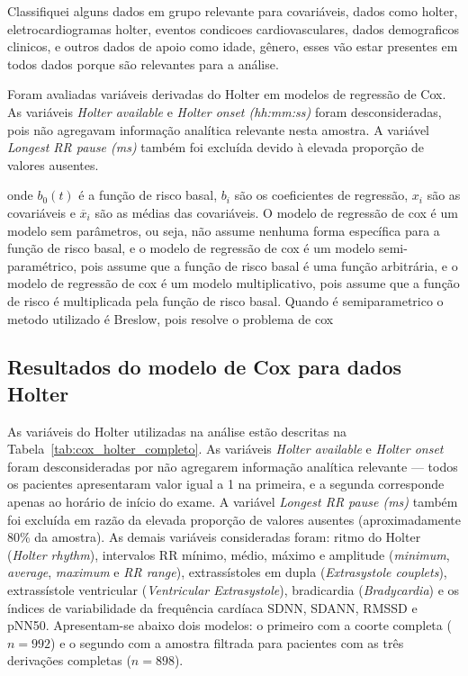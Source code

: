 Classifiquei alguns dados em grupo relevante para covariáveis, dados como holter, eletrocardiogramas holter, eventos condicoes cardiovasculares, dados demograficos clinicos, e outros dados de apoio como idade, gênero, esses vão estar presentes em todos dados porque são relevantes para a análise.


Foram avaliadas variáveis derivadas do Holter em modelos de regressão de Cox. As variáveis \textit{Holter available} e \textit{Holter onset (hh:mm:ss)} foram desconsideradas, pois não agregavam informa\c{c}\~ao anal\'itica relevante nesta amostra. A variável \textit{Longest RR pause (ms)} também foi excluída devido à elevada proporção de valores ausentes.

onde $b_0(t)$ é a função de risco basal, $b_i$ são os coeficientes de regressão, $x_i$ são as covariáveis e $\overline{x}_i$ são as médias das covariáveis. O modelo de regressão de cox é um modelo sem parâmetros, ou seja, não assume nenhuma forma específica para a função de risco basal, e o modelo de regressão de cox é um modelo semi-paramétrico, pois assume que a função de risco basal é uma função arbitrária, e o modelo de regressão de cox é um modelo multiplicativo, pois assume que a função de risco é multiplicada pela função de risco basal. Quando é semiparametrico o metodo utilizado é Breslow, pois resolve o problema de cox

\subsection{Resultados do modelo de Cox para dados Holter}


As variáveis do Holter utilizadas na análise estão descritas na
Tabela~\ref{tab:cox_holter_completo}. As variáveis \textit{Holter available}
e \textit{Holter onset} foram desconsideradas por não agregarem informação
analítica relevante — todos os pacientes apresentaram valor igual a 1 na
primeira, e a segunda corresponde apenas ao horário de início do exame.
A variável \textit{Longest RR pause (ms)} também foi excluída em razão da
elevada proporção de valores ausentes (aproximadamente 80\% da amostra).
As demais variáveis consideradas foram: ritmo do Holter
(\textit{Holter rhythm}), intervalos RR mínimo, médio, máximo e amplitude
(\textit{minimum}, \textit{average}, \textit{maximum} e \textit{RR range}),
extrassístoles em dupla (\textit{Extrasystole couplets}), extrassístole
ventricular (\textit{Ventricular Extrasystole}), bradicardia
(\textit{Bradycardia}) e os índices de variabilidade da frequência cardíaca SDNN, SDANN, RMSSD e pNN50. Apresentam-se abaixo dois modelos: o primeiro com a coorte completa ($n=992$) e o segundo com a amostra filtrada para pacientes com as três derivações completas ($n=898$).

